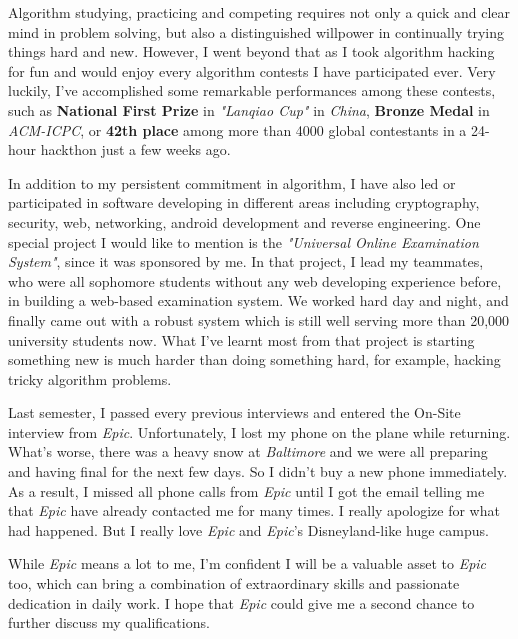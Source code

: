 \documentclass[11pt]{letter}
\newcommand{\company}{\emph{Epic}}
\begin{document}
\begin{letter}{
}
Algorithm studying, practicing and competing requires not only a quick and clear mind in problem solving, but also a distinguished willpower in continually trying things hard and new.
However, I went beyond that as I took algorithm hacking for fun and would enjoy every algorithm contests I have participated ever.
Very luckily, I've accomplished some remarkable performances among these contests, such as \textbf{National First Prize} in
\emph{"Lanqiao Cup"} in \emph{China}, \textbf{Bronze Medal} in \emph{ACM-ICPC}, or \textbf{42th place} among more than 4000 global contestants in a 24-hour hackthon just a few weeks ago.



In addition to my persistent commitment in algorithm, I have also led or participated in software developing in
different areas including cryptography, security, web, networking, android development and reverse engineering. 
One special project I would like to mention is the \emph{"Universal Online Examination System"}, since it was sponsored by me.
In that project, I lead my teammates, who were all sophomore students without any web developing experience before, in
building a web-based examination system. We worked hard day and night, and finally came out with a robust system which
is still well serving more than 20,000 university students now. What I've learnt most from that project is starting
something new is much harder than doing something hard, for example, hacking tricky algorithm  problems.




Last semester, I passed every previous interviews and entered the On-Site interview  from \company{}.  
Unfortunately, I lost my phone on the plane while returning. 
What's worse, there was a heavy snow at \emph{Baltimore} and we were all preparing and having final for the next
few days. So I didn't buy a new phone immediately. As a result, I missed all phone calls from \company{} until I got
the email telling me that \company{} have already contacted me for many times.
I really apologize for what had happened. 
But I really love \company{} and \company 's Disneyland-like huge campus. 

While \company{} means a lot to me, I'm confident
I will be a valuable asset to \company{} too, which can bring a combination of extraordinary skills and passionate
dedication in daily work. I hope that \company{} could give me a second chance to further discuss my qualifications.


\end{letter}
\end{document}
